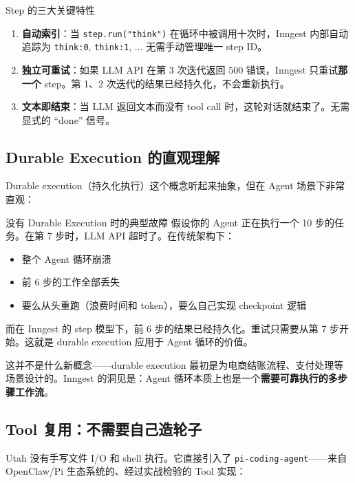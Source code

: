 \documentclass[a4paper]{article}
\begin{document}
\begin{importantbox}{Step 的三大关键特性}
\begin{enumerate}
    \item \textbf{自动索引}：当 \texttt{step.run("think")} 在循环中被调用十次时，Inngest 内部自动追踪为 \texttt{think:0}, \texttt{think:1}, ... 无需手动管理唯一 step ID。
    \item \textbf{独立可重试}：如果 LLM API 在第 3 次迭代返回 500 错误，Inngest 只重试\textbf{那一个} step。第 1、2 次迭代的结果已经持久化，不会重新执行。
    \item \textbf{文本即结束}：当 LLM 返回文本而没有 tool call 时，这轮对话就结束了。无需显式的 ``done'' 信号。
\end{enumerate}
\end{importantbox}

\subsection{Durable Execution 的直观理解}

Durable execution（持久化执行）这个概念听起来抽象，但在 Agent 场景下非常直观：

\begin{warningbox}{没有 Durable Execution 时的典型故障}
假设你的 Agent 正在执行一个 10 步的任务。在第 7 步时，LLM API 超时了。在传统架构下：
\begin{itemize}
    \item 整个 Agent 循环崩溃
    \item 前 6 步的工作全部丢失
    \item 要么从头重跑（浪费时间和 token），要么自己实现 checkpoint 逻辑
\end{itemize}
而在 Inngest 的 step 模型下，前 6 步的结果已经持久化。重试只需要从第 7 步开始。这就是 durable execution 应用于 Agent 循环的价值。
\end{warningbox}

这并不是什么新概念——durable execution 最初是为电商结账流程、支付处理等场景设计的。Inngest 的洞见是：Agent 循环本质上也是一个\textbf{需要可靠执行的多步骤工作流}。

\subsection{Tool 复用：不需要自己造轮子}

Utah 没有手写文件 I/O 和 shell 执行。它直接引入了 \texttt{pi-coding-agent}——来自 OpenClaw/Pi 生态系统的、经过实战检验的 Tool 实现：
\end{document}
